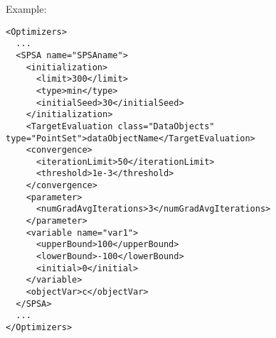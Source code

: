Example:
\begin{lstlisting}[style=XML]
<Optimizers>
  ...
  <SPSA name="SPSAname">
    <initialization>
      <limit>300</limit>
      <type>min</type>
      <initialSeed>30</initialSeed>
    </initialization>
    <TargetEvaluation class="DataObjects" type="PointSet">dataObjectName</TargetEvaluation>
    <convergence>
      <iterationLimit>50</iterationLimit>
      <threshold>1e-3</threshold>
    </convergence>
    <parameter>
      <numGradAvgIterations>3</numGradAvgIterations>
    </parameter>
    <variable name="var1">
      <upperBound>100</upperBound>
      <lowerBound>-100</lowerBound>
      <initial>0</initial>
    </variable>
    <objectVar>c</objectVar>
  </SPSA>
  ...
</Optimizers>
\end{lstlisting}
